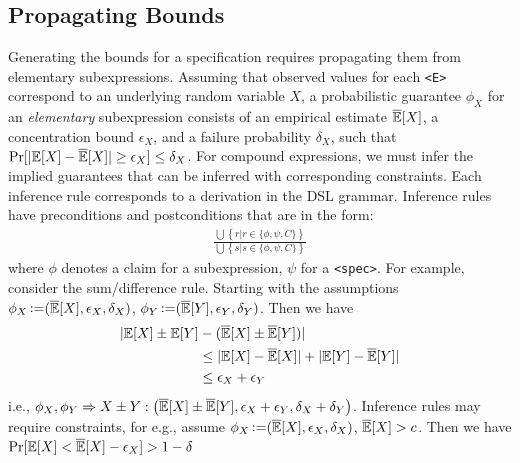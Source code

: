 \subsection{Propagating Bounds}
\label{sec:theoretical:propagation}
Generating the bounds for a specification requires propagating them from elementary subexpressions.
Assuming that observed values for each \texttt{<E>} correspond to an underlying random variable $X$,
a probabilistic guarantee $\phi_X$ for an \textit{elementary} subexpression consists of an empirical estimate $\overline{\mathbb{E}}[X]$, a concentration bound $\epsilon_X$, and a failure probability $\delta_X$, such that $\Pr[|\mathbb{E}[X] - \overline{\mathbb{E}}[X]|\geq \epsilon_X] \leq \delta_X$.
For compound expressions, we must infer the implied guarantees that can be inferred with corresponding constraints.
Each inference rule corresponds to a derivation in the DSL grammar.
Inference rules have preconditions and postconditions that are in the form:
\begin{align*}
 \frac{\bigcup \left\{r | r \in \{\phi, \psi, C \}\right\}}{\bigcup \left\{s | s \in \{ \phi, \psi, C \} \right\} }
\end{align*}
where $\phi$ denotes a claim for a subexpression, $\psi$ for a \verb|<spec>|.%
For example, consider the sum/difference rule. 
Starting with the assumptions $\phi_X \operatorname{\vcentcolon=} (\overline{\mathbb{E}}[X], \epsilon_X, \delta_X)$, $\phi_Y \operatorname{\vcentcolon=} (\overline{\mathbb{E}}[Y], \epsilon_Y, \delta_Y)$.
Then we have
\begin{align*}
    |\mathbb{E}[X] \pm  \mathbb{E}[Y] &- (\overline{\mathbb{E}}[X] \pm \overline{\mathbb{E}}[Y])| \\
                      & \leq |\mathbb{E}[X] - \overline{\mathbb{E}}[X]| + |\mathbb{E}[Y] - \overline{\mathbb{E}}[Y]|\\
                      & \leq \epsilon_X + \epsilon_Y
\end{align*}
i.e., $\phi_X, \phi_Y \Rightarrow X \pm Y: \left(\overline{\mathbb{E}}[X] \pm \overline{\mathbb{E}}[Y], \epsilon_X + \epsilon_Y, \delta_X + \delta_Y\right)$.
Inference rules may require constraints, for e.g., assume $\phi_X \operatorname{\vcentcolon=} (\overline{\mathbb{E}}[X], \epsilon_X, \delta_X)$, $\overline{\mathbb{E}}[X] > c$. 
Then we have $\Pr[\mathbb{E}[X] < \overline{\mathbb{E}}[X] - \epsilon_X] > 1 - \delta$
